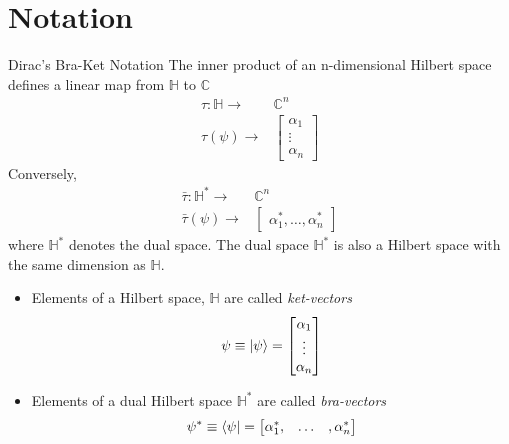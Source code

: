\section{Notation}
\begin{definition}{Dirac's Bra-Ket Notation}{}
The inner product of an n-dimensional Hilbert space defines a linear map from $\mathbb{H}$ to $\mathbb{C}$
\begin{align*}
  \tau: \mathbb{H}\longrightarrow& \mathbb{C}^{n} \\
  \tau(\psi) \longrightarrow& \begin{bmatrix}
           \alpha_{1} \\
           \vdots \\
           \alpha_{n}
         \end{bmatrix}
\end{align*}  
Conversely, 
\begin{align*}
  \bar{\tau}: \mathbb{H}^{*}\longrightarrow& \mathbb{C}^{n} \\
  \bar{\tau}(\psi)\longrightarrow& 
         \begin{bmatrix}
           \alpha_{1}^{*}, \hdots, \alpha_{n}^{*}
         \end{bmatrix}
\end{align*} 
where $\mathbb{H}^{*}$ denotes the dual space. The dual space $\mathbb{H}^{*}$ is also a Hilbert space with the same dimension as $\mathbb{H}$. 
\begin{itemize}
    \item Elements of a Hilbert space, $\mathbb{H}$ are called \textit{ket-vectors} 
\begin{equation}
    \psi \equiv \ket{\psi} =  \begin{bmatrix}
           \alpha_{1} \\
           \vdots \\
           \alpha_{n}
         \end{bmatrix}
\end{equation}
\item Elements of a dual Hilbert space $\mathbb{H}^{*}$ are called \textit{bra-vectors}
\begin{equation}
    \psi^{*} \equiv \bra{\psi} =  \begin{bmatrix}
           \alpha_{1}^{*}, & \hdots &, \alpha_{n}^{*}
         \end{bmatrix}
\end{equation}
\end{itemize}
\end{definition}
